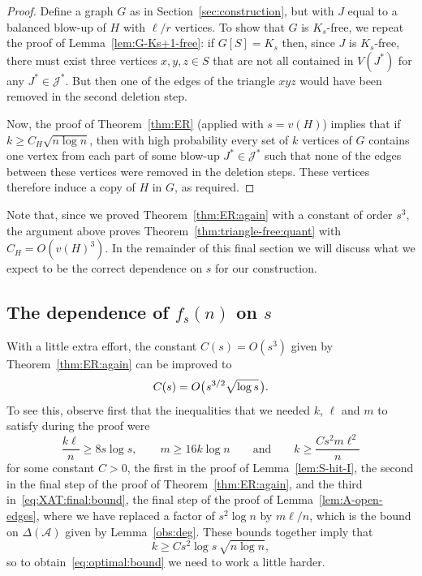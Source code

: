 \documentclass[12pt,reqno]{amsart}
\theoremstyle{remark}
\numberwithin{theorem}{section}
\renewcommand{\(}{\bigl(}
\renewcommand{\)}{\bigr)\vphantom{)}}
\newcommand{\cA}{\mathcal A}
\newcommand{\cJ}{\mathcal J}
\renewcommand{\ge}{\geqslant}
\begin{document}
\begin{proof}
Define a graph $G$ as in Section~\ref{sec:construction}, but with $J$ equal to a balanced blow-up of $H$ with $\ell/r$ vertices. To show that $G$ is $K_s$-free, we repeat the proof of Lemma~\ref{lem:G-Ks+1-free}: if $G[S] = K_s$ then, since $J$ is $K_s$-free, there must exist three vertices $x,y,z \in S$ that are not all contained in $V(J^*)$ for any $J^* \in \cJ^*$. But then one of the edges of the triangle $xyz$ would have been removed in the second deletion step.

Now, the proof of Theorem~\ref{thm:ER} (applied with $s = v(H)$) implies that if $k \ge C_H \displaystyle{ \sqrt{n \log n} }$, then with high probability every set of $k$ vertices of $G$ contains one vertex from each part of some blow-up $J^* \in \cJ^*$ such that none of the edges between these vertices were removed in the deletion steps. These vertices therefore induce a copy of $H$ in $G$, as required. 
\end{proof}

Note that, since we proved Theorem~\ref{thm:ER:again} with a constant of order $s^3$, the argument above proves Theorem~\ref{thm:triangle-free:quant} with $C_H = O(v(H)^3)$. In the remainder of this final section we will discuss what we expect to be the correct dependence on $s$ for our construction.  

\subsection{The dependence of $f_s(n)$ on $s$}\label{discussion:sec}

With a little extra effort, the constant $C(s) = O(s^3)$ given by Theorem~\ref{thm:ER:again} can be improved to 
\begin{equation}\label{eq:optimal:bound}
C(s) = O\big( \hspace{0.02cm} s^{3/2} \sqrt{\log s} \hspace{0.04cm} \big).
\end{equation}
To see this, observe first that the inequalities that we needed $k$, $\ell$ and $m$ to satisfy during the proof were
\begin{equation}\label{eq:klm:needs}
\frac{k \ell}{n} \ge 8 s \log s, \qquad m \ge 16 k \log n \qquad \text{and} \qquad k \ge \frac{C s^2 m \ell^2}{n}
\end{equation}
for some constant $C > 0$, the first in the proof of Lemma~\ref{lem:S-hit-I}, the second in the final step of the proof of Theorem~\ref{thm:ER:again}, and the third in~\eqref{eq:XAT:final:bound}, the final step of the proof of Lemma~\ref{lem:A-open-edges}, where we have replaced a factor of $s^2 \log n$ by $m\ell / n$, which is the bound on $\Delta(\cA)$ given by Lemma~\ref{obs:deg}. These bounds together imply that 
$$k \ge C s^2 \log s \, \sqrt{n \log n},$$
so to obtain~\eqref{eq:optimal:bound} we need to work a little harder. 
\end{document}
